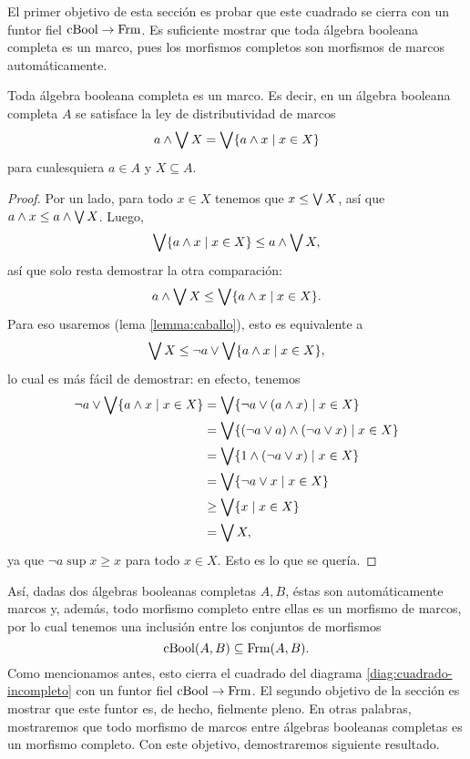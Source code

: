 El primer objetivo de esta sección es probar que este cuadrado se
cierra con un funtor fiel $\mathrm{cBool}\to\mathrm{Frm}$.
Es suficiente mostrar que toda álgebra booleana completa es un marco,
pues los morfismos completos son morfismos de marcos automáticamente.

\begin{lemma}
    Toda álgebra booleana completa es un marco.
    Es decir, en un álgebra booleana completa $A$ se satisface la
    ley de distributividad de marcos
    \[
        a\wedge\bigvee X = \bigvee\{a\wedge x\mid x\in X\}
    \]
    para cualesquiera $a\in A$ y $X\subseteq A$.
\end{lemma}
\begin{proof}
    Por un lado, para todo $x\in X$ tenemos que $x\leq\bigvee X$, así que
    $a\wedge x\leq a\wedge\bigvee X$.
    Luego,
    \[
        \bigvee\{a\wedge x\mid x\in X\} \leq a\wedge\bigvee X
    ,\]
    así que solo resta demostrar la otra comparación:
    \[
        a\wedge\bigvee X \leq \bigvee\{a\wedge x\mid x\in X\}
    .\]
    Para eso usaremos (lema \ref{lemma:caballo}),
    esto es equivalente a
    \[
        \bigvee X \leq \neg a\vee \bigvee\{a\wedge x\mid x\in X\}
    ,\]
    lo cual es más fácil de demostrar: en efecto, tenemos
    \begin{align*}
        \neg a\vee\bigvee\{a\wedge x\mid x\in X\}
        &= \bigvee\{\neg a \vee(a\wedge x) \mid x\in X\} \\
        &= \bigvee\{(\neg a\vee a)\wedge(\neg a\vee x) \mid x\in X\} \\
        &= \bigvee\{1\wedge(\neg a\vee x) \mid x\in X\} \\
        &= \bigvee\{\neg a\vee x \mid x\in X\} \\
        &\geq \bigvee\{x \mid x\in X\} \\
        &= \bigvee X,
    \end{align*}
    ya que $\neg a\sup x\geq x$ para todo $x\in X$.
    Esto es lo que se quería.
\end{proof}

Así, dadas dos álgebras booleanas completas $A,B$,
éstas son automáticamente marcos y, además, todo morfismo completo
entre ellas es un morfismo de marcos, por lo cual
tenemos una inclusión entre los conjuntos de morfismos
\[
  \mathrm{cBool}(A,B) \subseteq \mathrm{Frm}(A,B)
.\]
Como mencionamos antes, esto cierra el cuadrado del diagrama
\eqref{diag:cuadrado-incompleto} con un funtor fiel
$\mathrm{cBool}\to\mathrm{Frm}$.
El segundo objetivo de la sección es mostrar que este funtor
es, de hecho, fielmente pleno.
En otras palabras, mostraremos que todo morfismo de marcos entre
álgebras booleanas completas es un morfismo completo.
Con este objetivo, demostraremos siguiente resultado.

